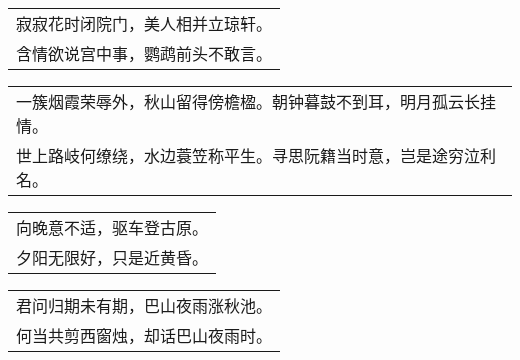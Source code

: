 \nopagebreak%
\nopagebreak%
\noindent\begin{minipage}{\linewidth}
  \vskip-3pt\begin{table}[H]
    \centering
    \begin{tabular}{@{}l@{}}
寂寂花时闭院门，美人相并立琼轩。\\
含情欲说宫中事，鹦鹉前头不敢言。
    \end{tabular}
  \end{table}
\end{minipage}
\vspace{1cm}


\nopagebreak%
\nopagebreak%
\noindent\begin{minipage}{\linewidth}
  \vskip-3pt\begin{table}[H]
    \centering
    \begin{tabular}{@{}l@{}}
一簇烟霞荣辱外，秋山留得傍檐楹。朝钟暮鼓不到耳，明月孤云长挂情。\\
世上路岐何缭绕，水边蓑笠称平生。寻思阮籍当时意，岂是途穷泣利名。
    \end{tabular}
  \end{table}
\end{minipage}
\vspace{1cm}


\nopagebreak%
\nopagebreak%
\noindent\begin{minipage}{\linewidth}
  \vskip-3pt\begin{table}[H]
    \centering
    \begin{tabular}{@{}l@{}}
向晚意不适，驱车登古原。\\
夕阳无限好，只是近黄昏。
    \end{tabular}
  \end{table}
\end{minipage}
\vspace{1cm}


\nopagebreak%
\nopagebreak%
\noindent\begin{minipage}{\linewidth}
  \vskip-3pt\begin{table}[H]
    \centering
    \begin{tabular}{@{}l@{}}
君问归期未有期，巴山夜雨涨秋池。\\
何当共剪西窗烛，却话巴山夜雨时。
    \end{tabular}
  \end{table}
\end{minipage}
\vspace{1cm}


